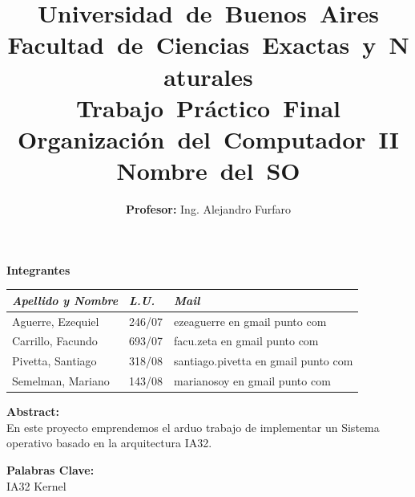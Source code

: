 \documentclass[a4paper,10pt]{article}
\begin{document}
 
\title{
	\mbox{\Huge Universidad de Buenos Aires}\\
	\mbox{\huge Facultad de Ciencias Exactas y Naturales}\\
	\vspace{20mm}
	\mbox{\textbf{Trabajo Pr\'actico Final}}\\
	\mbox{\textbf{Organización del Computador II}}\\
	\mbox{\textbf{Nombre del SO}}\\
	\vspace{8mm}
}
\author{\Large\textbf{Profesor:} Ing. Alejandro Furfaro}
\date{}
\maketitle \thispagestyle{empty}

\begin{center}
    \vspace{15mm}
    \textbf{Integrantes}\\

    \begin{tabular}{|l|l|l|}
        \hline
        \textit{Apellido y Nombre} & \textit{L.U.} & \textit{Mail} \\
        \hline
		Aguerre, Ezequiel & 246/07 & ezeaguerre en gmail punto com \\
        \hline
		Carrillo, Facundo & 693/07 & facu.zeta en gmail punto com \\
	    \hline
		Pivetta, Santiago & 318/08 & santiago.pivetta en gmail punto com \\
        \hline
		Semelman, Mariano & 143/08 & marianosoy en gmail punto com \\
        \hline
    \end{tabular}
\end{center}


\begin{center}
    \vspace{10mm}
    \textbf{Abstract:}\\    
   En este proyecto emprendemos el arduo trabajo de implementar un Sistema operativo basado en la arquitectura IA32.
    \vspace{5mm}
\end{center}

\begin{center}
    \vspace{5mm}
    \textbf{Palabras Clave:}\\
		IA32 Kernel
    \vspace{5mm}
\end{center}
\end{document}
